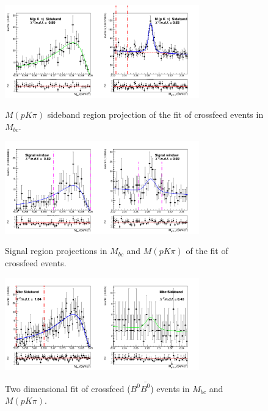 \begin{figure}[H]
\centering
{\includegraphics[width=0.75\textwidth]{06-chargedAnticorrBtoLambda/figs/InvM_Sideband_stream02345_Crossfeed_charged_anticorrLambdaC_2Dfit.png}}
\caption{$M(p K \pi)$ sideband region projection of the fit of crossfeed events in $M_{bc}$.}
\label{fig:InvM_Sideband_stream02345_Crossfeed_charged_anticorrLambdaC_2Dfit}
\end{figure}




\begin{figure}[H]
\centering
{\includegraphics[width=0.75\textwidth]{06-chargedAnticorrBtoLambda/figs/Signal_window_stream1_Crossfeed_charged_anticorrLambdaC_2Dfit.png}}
\caption{Signal region projections in $M_{bc}$ and $M(p K \pi)$  of the fit of crossfeed events.}
\label{fig:Signal_window_stream1_Crossfeed_charged_anticorrLambdaC_2Dfit}
\end{figure}


\begin{figure}[H]
\centering
{\includegraphics[width=0.75\textwidth]{06-chargedAnticorrBtoLambda/figs/Mbc_Sideband_stream1_Crossfeed_charged_anticorrLambdaC_2Dfit.png}}
\caption{Two dimensional fit of crossfeed ($B^0\bar{B^0}$) events in $M_{bc}$  and $M(p K \pi)$.}
\label{fig:Mbc_Sideband_stream1_Crossfeed_charged_anticorrLambdaC_2Dfit}
\end{figure}

